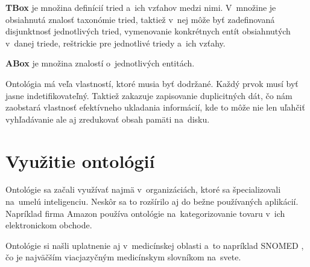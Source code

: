 \documentclass[12pt, a4paper, oneside]{book}
\begin{document}
\textbf{TBox} je množina definícií tried a~ich vzťahov medzi nimi. V~množine je obsiahnutá znalosť taxonómie tried, taktiež v~nej môže byť zadefinovaná disjunktnosť jednotlivých tried, vymenovanie konkrétnych entít obsiahnutých v~danej triede, reštrickie pre jednotlivé triedy a~ich vzťahy.


\textbf{ABox} je množina znalostí o~jednotlivých entitách.


Ontológia má veľa vlastností, ktoré musia byť dodržané. Každý prvok musí byť jasne indetifikovateľný. Taktiež zakazuje zapisovanie duplicitných dát, čo nám zaobstará vlastnosť efektívneho ukladania informácií, kde to môže nie len uľahčiť vyhľadávanie ale aj zredukovať obsah pamäti na~disku. 


\section{Využitie ontológií}

Ontológie sa začali využívať najmä v~organizáciách, ktoré sa špecializovali na~umelú inteligenciu. Neskôr sa to rozšírilo aj do bežne používaných aplikácií. Napríklad firma Amazon používa ontológie na~kategorizovanie tovaru v~ich elektronickom obchode.



Ontológie si našli uplatnenie aj v~medicínskej oblasti a~to napríklad SNOMED \citep{snomed}, čo je najväčším viacjazyčným medicínskym slovníkom na~svete. 
\end{document}
